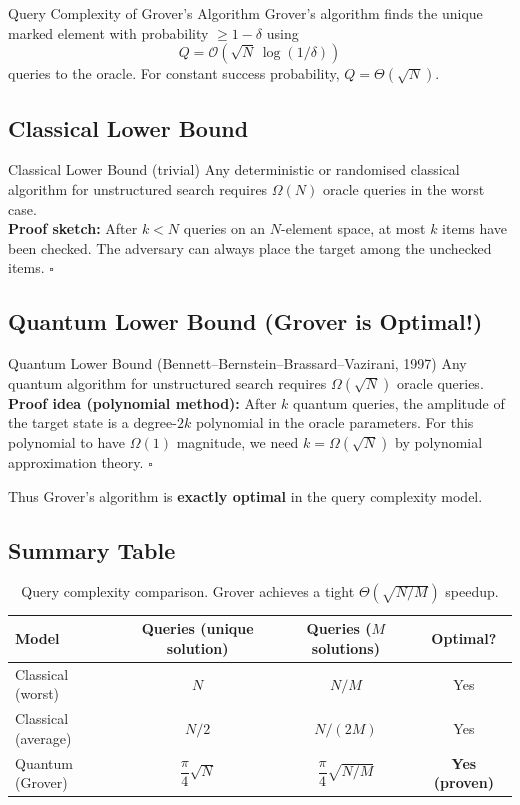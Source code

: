 \documentclass[12pt,a4paper]{article}
\newcommand{\Order}[1]{\mathcal{O}\!\left(#1\right)}
\begin{document}
\begin{thmbox}{Query Complexity of Grover's Algorithm}
Grover's algorithm finds the unique marked element with probability $\geq 1-\delta$ using
\[
  Q = \Order{\sqrt{N}\,\log(1/\delta)}
\]
queries to the oracle. For constant success probability, $Q = \Theta(\sqrt{N})$.
\end{thmbox}

\subsection{Classical Lower Bound}

\begin{thmbox}{Classical Lower Bound (trivial)}
Any deterministic or randomised classical algorithm for unstructured search requires $\Omega(N)$ oracle queries in the worst case.\\[4pt]
\textbf{Proof sketch:} After $k < N$ queries on an $N$-element space, at most $k$ items have been checked. The adversary can always place the target among the unchecked items. $\square$
\end{thmbox}

\subsection{Quantum Lower Bound (Grover is Optimal!)}

\begin{thmbox}{Quantum Lower Bound (Bennett–Bernstein–Brassard–Vazirani, 1997)}
Any quantum algorithm for unstructured search requires $\Omega(\sqrt{N})$ oracle queries.\\[4pt]
\textbf{Proof idea (polynomial method):} After $k$ quantum queries, the amplitude of the target state is a degree-$2k$ polynomial in the oracle parameters. For this polynomial to have $\Omega(1)$ magnitude, we need $k = \Omega(\sqrt{N})$ by polynomial approximation theory. $\square$
\end{thmbox}

Thus Grover's algorithm is \textbf{exactly optimal} in the query complexity model.

\subsection{Summary Table}

\begin{table}[H]
\centering
\begin{tabular}{lccc}
\toprule
\textbf{Model} & \textbf{Queries (unique solution)} & \textbf{Queries ($M$ solutions)} & \textbf{Optimal?} \\
\midrule
Classical (worst) & $N$ & $N/M$ & Yes \\
Classical (average) & $N/2$ & $N/(2M)$ & Yes \\
Quantum (Grover) & $\dfrac{\pi}{4}\sqrt{N}$ & $\dfrac{\pi}{4}\sqrt{N/M}$ & \textbf{Yes (proven)} \\
\bottomrule
\end{tabular}
\caption{Query complexity comparison. Grover achieves a tight $\Theta(\sqrt{N/M})$ speedup.}
\end{table}
\end{document}

